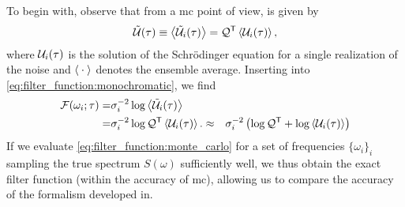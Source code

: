 To begin with, observe that from a \gls{mc} point of view, \liouvUe is given by
\begin{align}
    \liouvUe(\tau) \equiv \expval{\liouvUe_i(\tau)} = \liouvQ\transpose \expval{\liouvU_i(\tau)},
\end{align}
where $\mathcal{U}_i(\tau)$ is the solution of the Schrödinger equation for a single realization of the noise and $\expval{\:\cdot\:}$ denotes the ensemble average.
Inserting into \cref{eq:filter_function:monochromatic}, we find
\begin{equation}
    \label{eq:filter_function:monte_carlo}
    \begin{split}
        \mc{F}(\omega_i; \tau) =& \sigma_i^{-2}\log\expval{\liouvUe_i(\tau)} \\
                               =& \sigma_i^{-2}\log\liouvQ\transpose\expval{\liouvU_i(\tau)}.
                         \approx& \sigma_i^{-2}\left(\log\liouvQ\transpose + \log\expval{\liouvU_i(\tau)}\right)
    \end{split}
\end{equation}
If we evaluate \cref{eq:filter_function:monte_carlo} for a set of frequencies $\lbrace\omega_i\rbrace_i$ sampling the true spectrum $S(\omega)$ sufficiently well, we thus obtain the exact filter function \FF (within the accuracy of \gls{mc}), allowing us to compare the accuracy of the formalism developed in.

